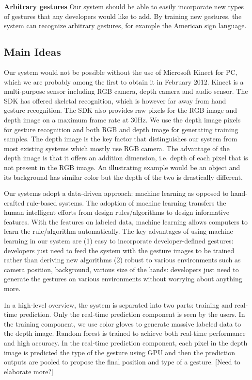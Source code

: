 \textbf{Arbitrary gestures} Our system should be able to easily incorporate new types of gestures that any developers would like to add. By training new gestures, the system can recognize arbitrary gestures, for example the American sign language. 

\subsection{Main Ideas}
Our system would not be possible without the use of Microsoft Kinect for PC, which we are probably among the first to obtain it in February 2012. Kinect is a multi-purpose sensor including RGB camera, depth camera and audio sensor. The SDK has offered skeletal recognition, which is however far away from hand gesture recognition. The SDK also provides raw pixels for the RGB image and depth image on a maximum frame rate at 30Hz. We use the depth image pixels for gesture recognition and both RGB and depth image for generating training samples. The depth image is the key factor that distinguishes our system from most existing systems which mostly use RGB camera. The advantage of the depth image is that it offers an addition dimension, i.e. depth of each pixel that is not present in the RGB image. An illustrating example would be an object and its background has similar color but the depth of the two is drastically different. 

Our systems adopt a data-driven approach: machine learning as opposed to hand-crafted rule-based systems. The adoption of machine learning transfers the human intelligent efforts from design rules/algorithms to design informative features. With the features on labeled data, machine learning allows computers to learn the rule/algorithm automatically. The key advantages of using machine learning in our system    
are (1) easy to incorporate developer-defined gestures: developers just need to feed the system with the gesture images to be trained rather than deriving new algorithms (2) robust to various environments such as camera position, background, various size of the hands: developers just need to generate the gestures on various environments without worrying about anything more. 

In a high-level overview, the system is separated into two parts: training and real-time prediction. Only the real-time prediction component is seen by the users. In the training component, we use color gloves to generate massive labeled data to the depth image. Random forest is trained to achieve both real-time performance and high accuracy. In the real-time prediction component, each pixel in the depth image is predicted the type of the gesture using GPU and then the prediction outputs are pooled to propose the final position and type of a gesture. [Need to elaborate more?] 



